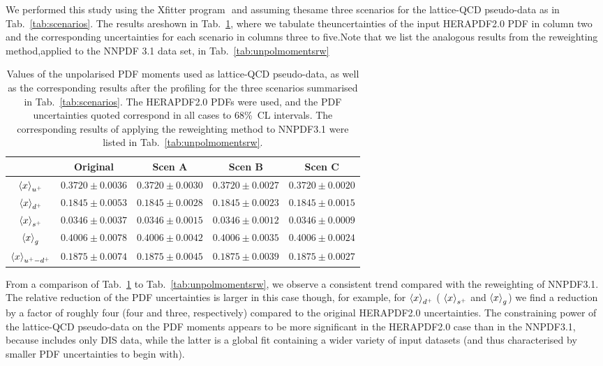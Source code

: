 We​ ​performed​ ​this​ ​study​ ​using​ ​the​ ​Xfitter​ ​program​ ​\cite{Alekhin:2014irh}​ ​and​ ​assuming​ ​the​ ​same​ ​three
scenarios​ ​for​ ​the​ ​lattice-QCD​ ​pseudo-data​ ​as​ ​in​ ​Tab.~\ref{tab:scenarios}.​ ​The​ ​results​ ​are​ ​shown​ ​in​ ​Tab.~\ref{tab:unpolmomentsProf},
where​ ​we​ ​tabulate​ ​the​ ​uncertainties​ ​of​ ​the​ ​input​ ​HERAPDF2.0​ ​PDF​ ​in​ ​column​ ​two​ ​and​ ​the
corresponding​ ​uncertainties​ ​for​ ​each​ ​scenario​ ​in​ ​columns​ ​three​ ​to​ ​five.​ ​Note​ ​that​ ​we​ ​list​ ​the
analogous​ ​results​ ​from​ ​the​ ​reweighting​ ​method,​ ​applied​ ​to​ ​the​ ​NNPDF​ ​3.1​ ​data​ ​set,​ ​in​ ​Tab.~\ref{tab:unpolmomentsrw}


\begin{table}[h]
  \centering
  \renewcommand{\arraystretch}{1.3} 
\begin{tabular}{c||c|c|c|c}
  \hline &  Original  & Scen A  &  Scen B  &  Scen C  \\
  \hline
  \hline
  $\left\langle x\right\rangle_{u^+}$     &  $0.3720\pm 0.0036$  &  $0.3720\pm 0.0030$  &  $0.3720\pm 0.0027$  &  $0.3720\pm 0.0020$ \\
  $\left\langle x\right\rangle_{d^+}$     &  $0.1845\pm 0.0053$  &  $0.1845\pm 0.0028$  &  $0.1845\pm 0.0023$  &  $0.1845\pm 0.0015$ \\
  $\left\langle x\right\rangle_{s^+}$     &  $0.0346\pm 0.0037$  &  $0.0346\pm 0.0015$  &  $0.0346\pm 0.0012$  &  $0.0346\pm 0.0009$ \\
  $\left\langle x\right\rangle_{g}$       &  $0.4006\pm 0.0078$  &  $0.4006\pm 0.0042$  &  $0.4006\pm 0.0035$  &  $0.4006\pm 0.0024$ \\
  $\left\langle x\right\rangle_{u^+-d^+}$ &  $0.1875\pm 0.0074$  &  $0.1875\pm 0.0045$  &  $0.1875\pm 0.0039$  &  $0.1875\pm 0.0027$ \\
  \hline
\end{tabular}
\caption{\small Values of the unpolarised PDF moments
  used as lattice-QCD pseudo-data, as well as the corresponding results
  after the profiling  for the
three scenarios summarised in Tab.~\ref{tab:scenarios}.
%
The HERAPDF2.0 PDFs were used, and the PDF uncertainties quoted correspond in all cases to 68\%~CL intervals.
%
The corresponding results of applying the reweighting method
to NNPDF3.1 were listed in Tab.~\ref{tab:unpolmomentsrw}.
\label{tab:unpolmomentsProf}
}
\end{table}

From a comparison of Tab.~\ref{tab:unpolmomentsProf} to Tab.~\ref{tab:unpolmomentsrw},
we observe a consistent trend compared with the reweighting of NNPDF3.1.
%
The relative reduction of the PDF uncertainties is larger
in this case though, for example, for $\left\langle x\right\rangle_{d^+}$ ( $\left\langle x\right\rangle_{s^+}$
and  $\left\langle x\right\rangle_g$) we find a reduction by a factor of roughly
four (four and three, respectively) compared to the original
HERAPDF2.0 uncertainties.
%
The constraining power of the lattice-QCD pseudo-data
on the PDF moments appears to be more significant in the
HERAPDF2.0 case than in the NNPDF3.1, because includes only DIS data, while the latter
is a global fit containing a wider variety of
input datasets (and thus characterised by smaller
PDF uncertainties to begin with).

